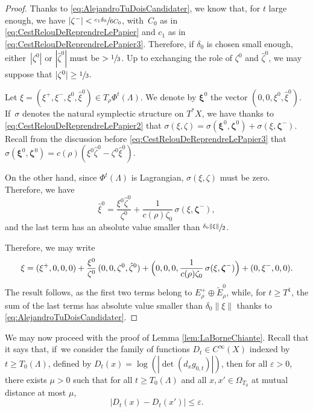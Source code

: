 \documentclass[10pt]{amsart}
\theoremstyle{plain}
\theoremstyle{definition}
\begin{document}
\begin{proof}
Thanks to \eqref{eq:AlejandroTuDoisCandidater}, we know that, for $t$ large enough, we have $|\zeta^-|< \sfrac{c_1 \delta_0}{6C_0}$, with~$C_0$ as in \eqref{eq:CestRelouDeReprendreLePapier} and $c_1$ as in \eqref{eq:CestRelouDeReprendreLePapier3}. Therefore, if $\delta_0$ is chosen small enough, either~$|\zeta^0|$ or $|\hat{\zeta}^0|$ must be $> \sfrac{1}{3}$. Up to exchanging the role of $\zeta^0$ and $\hat{\zeta}^0$, we may suppose that $|\zeta^0| \geq \sfrac{1}{3}$.

Let $\xi= (\xi^+, \xi^-, \xi^0, \hat{\xi}^0)\in T_\rho \Phi^t(\Lambda)$. We denote by $\boldsymbol{\xi}^0$ the vector $(0, 0, \xi^0, \hat{\xi}^0)$.
If~$\sigma$ denotes the natural symplectic structure on $T^*X$, we have thanks to \eqref{eq:CestRelouDeReprendreLePapier2} that $\sigma(\xi, \zeta)= \sigma(\boldsymbol{\xi}^0, \boldsymbol{\zeta}^0) + \sigma(\xi, \boldsymbol{\zeta}^-)$. Recall from the discussion before \eqref{eq:CestRelouDeReprendreLePapier3} that $\sigma(\boldsymbol{\xi}^0, \boldsymbol{\zeta}^0)= c(\rho)(\xi^0 \hat{\zeta}^0 - \zeta^0 \hat{\xi}^0)$.

On the other hand, since $\Phi^t(\Lambda)$ is Lagrangian, $\sigma(\xi, \zeta)$ must be zero. Therefore, we have
\begin{equation}
\hat{\xi}^0 = \frac{ \xi^0 \hat{\zeta}^0}{\zeta^0} + \frac{1}{c(\rho) \zeta_0}\, \sigma(\xi, \boldsymbol{\zeta}^-),
\end{equation}
and the last term has an absolute value smaller than $\sfrac{\delta_0\|\xi\|}{2} $.

Therefore, we may write
\[
\xi = (\xi^+, 0, 0, 0) + \frac{\xi^0}{\zeta^0}\, (0, 0, \zeta^0, \hat{\zeta}^0) + \Bigl(0,0,0, \frac{1}{c(\rho)\zeta_0}\, \sigma(\xi, \boldsymbol{\zeta}^-)\Bigr) + (0, \xi^-, 0,0).
\]
The result follows, as the first two terms belong to $E_\rho^+\oplus \tilde{E}_\rho^0$, while, for $t\geq T^1$, the sum of the last terms has absolute value smaller than $\delta_0 \|\xi\|$ thanks to \eqref{eq:AlejandroTuDoisCandidater}.
\end{proof}

We may now proceed with the proof of Lemma \ref{lem:LaBorneChiante}. Recall that it says that, if~we consider the family of functions $D_t\in C^\infty(X)$ indexed by $t\geq T_0(\Lambda)$, defined by $D_t(x)=\log(|{\det}(d_x g_{0,t})|)$, then for all $\varepsilon>0$, there exists $\mu>0$ such that for all $t\geq T_0(\Lambda)$ and all $x,x'\in \Omega_{T_0}$ at mutual distance at most $\mu$,\vspace*{-2pt}
\begin{equation}\label{eq:unif_cont}
|D_t(x)-D_t(x')|\leq \varepsilon.
\end{equation}
\end{document}

